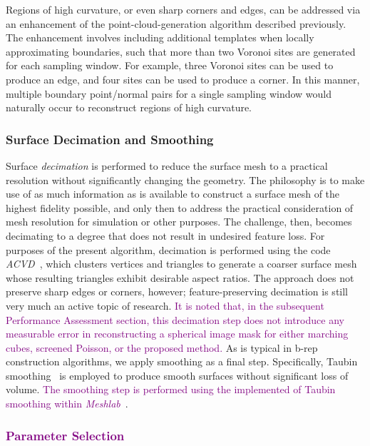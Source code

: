 %
Regions of high curvature, or even sharp corners and edges, can be addressed via an enhancement of the point-cloud-generation algorithm described previously. The enhancement involves including additional templates when locally approximating boundaries, such that more than two Voronoi sites are generated for each sampling window. For example, three Voronoi sites can be used to produce an edge, and four sites can be used to produce a corner. In this manner, multiple boundary point/normal pairs for a single sampling window would naturally occur to reconstruct regions of high curvature.

\subsubsection{Surface Decimation and Smoothing}

Surface \textit{decimation} is performed to reduce the surface mesh to a practical resolution without significantly changing the geometry. The philosophy is to make use of as much information as is available to construct a surface mesh of the highest fidelity possible, and only then to address the practical consideration of mesh resolution for simulation or other purposes. The challenge, then, becomes decimating to a degree that does not result in undesired feature loss.  For purposes of the present algorithm, decimation is performed using the code \textit{ACVD}~\cite{valette_2004, valette_2008}, which clusters vertices and triangles to generate a coarser surface mesh whose resulting triangles exhibit desirable aspect ratios. The approach does not preserve sharp edges or corners, however; feature-preserving decimation is still very much an active topic of research. \textcolor{purple}{It is noted that, in the subsequent Performance Assessment section, this decimation step does not introduce any measurable error in reconstructing a spherical image mask for either marching cubes, screened Poisson, or the proposed method.} As is typical in b-rep construction algorithms, we apply smoothing as a final step. Specifically, Taubin smoothing~\cite{taubin1995signal, taubin_1995} is employed to produce smooth surfaces without significant loss of volume. \textcolor{purple}{The smoothing step is performed using the implemented of Taubin smoothing within \textit{Meshlab}~\cite{meshlab}}.

\subsubsection{\textcolor{purple}{Parameter Selection}}

